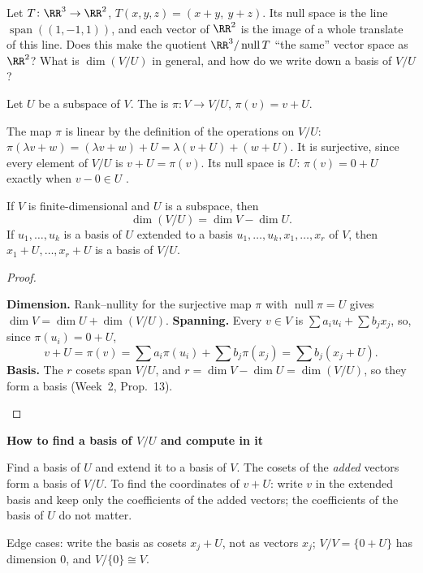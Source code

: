 \documentclass[10pt]{scrartcl}
\DeclareMathOperator{\spn}{span}\DeclareMathOperator{\nul}{null}\DeclareMathOperator{\range}{range}
\newenvironment{methodbox}[1]{\begin{mdframed}[style=methodstyle]\textbf{\color{NavyBlue}#1}\par\vspace{2pt}}{\end{mdframed}}
\begin{document}
\begin{qbox}
  Let $T\colon\RR^3\to\RR^2$, $T(x,y,z)=(x+y,\ y+z)$. Its null space is the line $\spn((1,-1,1))$, and each vector of $\RR^2$ is the image of a whole translate of this line. Does this make the quotient $\RR^3/\nul T$ ``the same'' vector space as $\RR^2$? What is $\dim(V/U)$ in general, and how do we write down a basis of $V/U$?
\end{qbox}

\begin{definition*}
  Let $U$ be a subspace of $V$. The  is $\pi\colon V\to V/U$, $\pi(v)=v+U$.
\end{definition*}

The map $\pi$ is linear by the definition of the operations on $V/U$: $\pi(\lambda v+w)=(\lambda v+w)+U=\lambda(v+U)+(w+U)$. It is surjective, since every element of $V/U$ is $v+U=\pi(v)$. Its null space is $U$: $\pi(v)=0+U$ exactly when $v-0\in U$ .

\begin{proposition*}
  If $V$ is finite-dimensional and $U$ is a subspace, then
  \[
    \dim(V/U) = \dim V - \dim U.
  \]
  If $u_1,\dots,u_k$ is a basis of $U$ extended to a basis $u_1,\dots,u_k,x_1,\dots,x_r$ of $V$, then $x_1+U,\dots,x_r+U$ is a basis of $V/U$.
\end{proposition*}
\begin{proof}
  \begin{steps}
    \ii \textbf{Dimension.} Rank--nullity  for the surjective map $\pi$ with $\nul\pi=U$ gives $\dim V=\dim U+\dim(V/U)$.
    \ii \textbf{Spanning.} Every $v\in V$ is $\sum a_iu_i+\sum b_jx_j$, so, since $\pi(u_i)=0+U$,
    \[
      v+U=\pi(v)=\sum a_i\pi(u_i)+\sum b_j\pi(x_j)=\sum b_j(x_j+U).
    \]
    \ii \textbf{Basis.} The $r$ cosets span $V/U$, and $r=\dim V-\dim U=\dim(V/U)$, so they form a basis (Week~2, Prop.~13).
  \end{steps}
\end{proof}

\begin{methodbox}{How to find a basis of $V/U$ and compute in it}
  \begin{steps}
    \ii Find a basis of $U$ and extend it to a basis of $V$. The cosets of the \emph{added} vectors form a basis of $V/U$.
    \ii To find the coordinates of $v+U$: write $v$ in the extended basis and keep only the coefficients of the added vectors; the coefficients of the basis of $U$ do not matter.
  \end{steps}
  Edge cases: write the basis as cosets $x_j+U$, not as vectors $x_j$; $V/V=\{0+U\}$ has dimension $0$, and $V/\{0\}\cong V$.
\end{methodbox}
\end{document}
